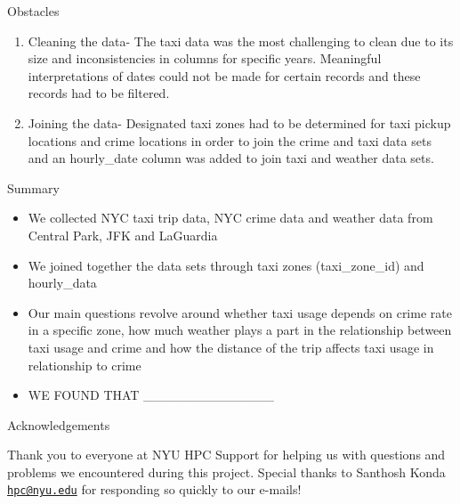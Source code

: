 \documentclass[10pt,ignorenonframetext,]{beamer}
\providecommand{\tightlist}{%
  \setlength{\itemsep}{0pt}\setlength{\parskip}{0pt}}
\begin{document}
\begin{frame}{Obstacles}

\begin{enumerate}
\def\labelenumi{\arabic{enumi}.}
\item
  Cleaning the data- The taxi data was the most challenging to clean due
  to its size and inconsistencies in columns for specific years.
  Meaningful interpretations of dates could not be made for certain
  records and these records had to be filtered.
\item
  Joining the data- Designated taxi zones had to be determined for taxi
  pickup locations and crime locations in order to join the crime and
  taxi data sets and an hourly\_date column was added to join taxi and
  weather data sets.
\end{enumerate}

\end{frame}

\begin{frame}{Summary}

\begin{itemize}
\tightlist
\item
  We collected NYC taxi trip data, NYC crime data and weather data from
  Central Park, JFK and LaGuardia
\item
  We joined together the data sets through taxi zones (taxi\_zone\_id)
  and hourly\_data
\item
  Our main questions revolve around whether taxi usage depends on crime
  rate in a specific zone, how much weather plays a part in the
  relationship between taxi usage and crime and how the distance of the
  trip affects taxi usage in relationship to crime
\item
  WE FOUND THAT \_\_\_\_\_\_\_\_\_\_\_\_\_\_
\end{itemize}

\end{frame}

\begin{frame}{Acknowledgements}

Thank you to everyone at NYU HPC Support for helping us with questions
and problems we encountered during this project. Special thanks to
Santhosh Konda \href{mailto:hpc@nyu.edu}{\nolinkurl{hpc@nyu.edu}} for
responding so quickly to our e-mails!

\end{frame}
\end{document}
